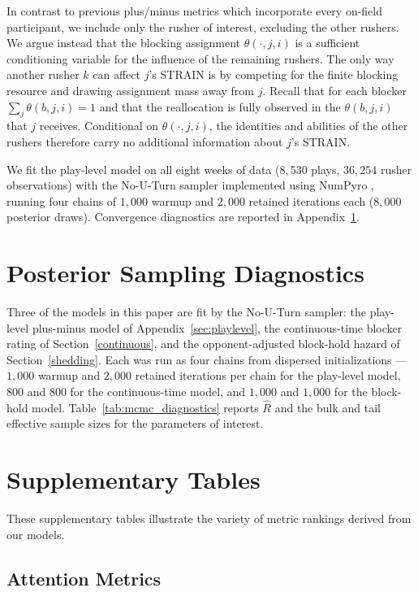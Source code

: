 \documentclass[USenglish]{article}
\let\OldSubsection\subsection
\renewcommand{\subsection}{\FloatBarrier\OldSubsection}
\theoremstyle{dgthm}
\theoremstyle{dgdef}
\begin{document}
\begin{appendices}
In contrast to previous plus/minus metrics which incorporate every on-field participant, we include only the rusher of interest, excluding the other rushers. We argue instead that the blocking assignment $\theta(\cdot, j, i)$ is a sufficient conditioning variable for the influence of the remaining rushers. The only way another rusher $k$ can affect $j$'s STRAIN is by competing for the finite blocking resource and drawing assignment mass away from $j$. Recall that for each blocker $\sum_{j} \theta(b,j,i) = 1$ and that the reallocation is fully observed in the $\theta(b,j,i)$ that $j$ receives. Conditional on $\theta(\cdot, j, i)$, the identities and abilities of the other rushers therefore carry no additional information about $j$'s STRAIN.

We fit the play-level model on all eight weeks of data ($8{,}530$ plays, $36{,}254$ rusher observations) with the No-U-Turn sampler \citep{hoffman2014no} implemented using NumPyro \citep{phan2019composable}, running four chains of $1{,}000$ warmup and $2{,}000$ retained iterations each ($8{,}000$ posterior draws). Convergence diagnostics are reported in Appendix~\ref{sec:diagnostics}.

\FloatBarrier
\section{Posterior Sampling Diagnostics} \label{sec:diagnostics}
Three of the models in this paper are fit by the No-U-Turn sampler: the play-level plus-minus model of Appendix~\ref{sec:playlevel}, the continuous-time blocker rating of Section~\ref{continuous}, and the opponent-adjusted block-hold hazard of Section~\ref{shedding}. Each was run as four chains from dispersed initializations --- $1{,}000$ warmup and $2{,}000$ retained iterations per chain for the play-level model, $800$ and $800$ for the continuous-time model, and $1{,}000$ and $1{,}000$ for the block-hold model.
Table~\ref{tab:mcmc_diagnostics} reports $\widehat{R}$ and the bulk and tail effective sample sizes for the parameters of interest.


\clearpage
\section{Supplementary Tables}
These supplementary tables illustrate the variety of metric rankings derived from our models.
\subsection{Attention Metrics}


\end{appendices}
\end{document}
